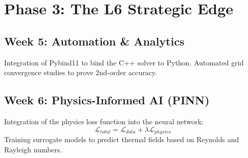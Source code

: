 \chapter{Phase 3: The L6 Strategic Edge}

\section{Week 5: Automation \& Analytics}
Integration of Pybind11 to bind the C++ solver to Python. Automated grid convergence studies to prove 2nd-order accuracy.

\section{Week 6: Physics-Informed AI (PINN)}
Integration of the physics loss function into the neural network:
\begin{equation}
\mathcal{L}_{total} = \mathcal{L}_{data} + \lambda \mathcal{L}_{physics}
\end{equation}
Training surrogate models to predict thermal fields based on Reynolds and Rayleigh numbers.
